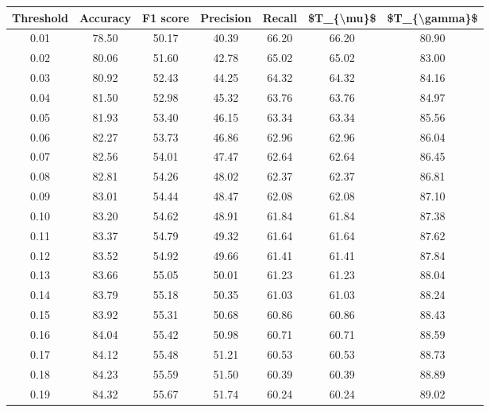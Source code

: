 \begin{tabular}{|c|c|c|c|c|c|c|}
\hline
 Threshold &  Accuracy &  F1 score &  Precision &  Recall &  \$T\_\{\textbackslash mu\}\$ &  \$T\_\{\textbackslash gamma\}\$ \\
\hline
      0.01 &     78.50 &     50.17 &      40.39 &   66.20 &      66.20 &         80.90 \\
      0.02 &     80.06 &     51.60 &      42.78 &   65.02 &      65.02 &         83.00 \\
      0.03 &     80.92 &     52.43 &      44.25 &   64.32 &      64.32 &         84.16 \\
      0.04 &     81.50 &     52.98 &      45.32 &   63.76 &      63.76 &         84.97 \\
      0.05 &     81.93 &     53.40 &      46.15 &   63.34 &      63.34 &         85.56 \\
      0.06 &     82.27 &     53.73 &      46.86 &   62.96 &      62.96 &         86.04 \\
      0.07 &     82.56 &     54.01 &      47.47 &   62.64 &      62.64 &         86.45 \\
      0.08 &     82.81 &     54.26 &      48.02 &   62.37 &      62.37 &         86.81 \\
      0.09 &     83.01 &     54.44 &      48.47 &   62.08 &      62.08 &         87.10 \\
      0.10 &     83.20 &     54.62 &      48.91 &   61.84 &      61.84 &         87.38 \\
      0.11 &     83.37 &     54.79 &      49.32 &   61.64 &      61.64 &         87.62 \\
      0.12 &     83.52 &     54.92 &      49.66 &   61.41 &      61.41 &         87.84 \\
      0.13 &     83.66 &     55.05 &      50.01 &   61.23 &      61.23 &         88.04 \\
      0.14 &     83.79 &     55.18 &      50.35 &   61.03 &      61.03 &         88.24 \\
      0.15 &     83.92 &     55.31 &      50.68 &   60.86 &      60.86 &         88.43 \\
      0.16 &     84.04 &     55.42 &      50.98 &   60.71 &      60.71 &         88.59 \\
      0.17 &     84.12 &     55.48 &      51.21 &   60.53 &      60.53 &         88.73 \\
      0.18 &     84.23 &     55.59 &      51.50 &   60.39 &      60.39 &         88.89 \\
      0.19 &     84.32 &     55.67 &      51.74 &   60.24 &      60.24 &         89.02 \\

\end{tabular}
